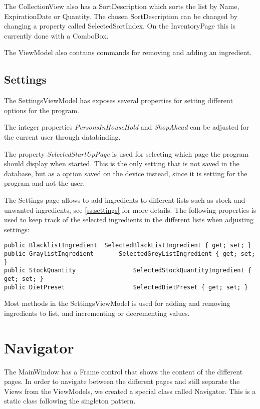 The CollectionView also has a SortDescription which sorts the list by Name, ExpirationDate or Quantity. The chosen SortDescription can be changed by changing a property called SelectedSortIndex. On the InventoryPage this is currently done with a ComboBox.

The ViewModel also contains commands for removing and adding an ingredient.

\section{Settings}
The SettingsViewModel has exposes several properties for setting different options for the program.

The integer properties \textit{PersonsInHouseHold} and \textit{ShopAhead} can be adjusted for the current user through databinding.

The property \textit{SelectedStartUpPage} is used for selecting which page the program should display when started. This is the only setting that is not saved in the database, but as a option saved on the device instead, since it is setting for the program and not the user.

The Settings page allows to add ingredients to different lists such as stock and unwanted ingredients, see \cref{ss:settings} for more details.
The following properties is used to keep track of the selected ingredients in the different lists when adjusting settings:
\begin{lstlisting}[caption=Selected list items, language=CSharp]
public BlacklistIngredient	SelectedBlackListIngredient { get; set; }
public GraylistIngredient		SelectedGreyListIngredient { get; set; }
public StockQuantity 				SelectedStockQuantityIngredient { get; set; }
public DietPreset 					SelectedDietPreset { get; set; }
\end{lstlisting}

Most methods in the SettingsViewModel is used for adding and removing ingredients to list, and incrementing or decrementing values.

\chapter{Navigator}
The MainWindow has a Frame control that shows the content of the different pages. In order to navigate between the different pages and still separate the Views from the ViewModels, we created a special class called Navigator. This is a static class following the singleton pattern. 

